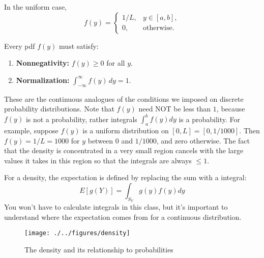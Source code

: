 In the uniform case,  
\[
f(y) = 
\begin{cases}
1/L, & y \in [a,b], \\
0, & \text{otherwise}.
\end{cases}
\]  

Every pdf \(f(y)\) must satisfy:  
\begin{enumerate}
\item \textbf{Nonnegativity:} \(f(y) \ge 0\) for all \(y\).  
\item \textbf{Normalization:} \(\int_{-\infty}^{\infty} f(y)\,dy = 1\).  
\end{enumerate}

These are the continuous analogues of the conditions we imposed on discrete probability distributions.  Note that $f(y)$ need NOT be less than $1$, because $f(y)$ is not a probability, rather integrals $\int_{a}^bf(y)dy$ is a probability. For example, suppose $f(y)$ is a uniform distribution on $[0,L] = [0,1/1000]$. Then $f(y) = 1/L = 1000$ for $y$ between $0$ and $1/1000$, and zero otherwise. The fact that the density is concentrated in a very small region cancels with the large values it takes in this region so that the integrals are always $\le 1$.

For a density, the expectation is defined by replacing the sum with a integral: 
\begin{equation}
E[g(Y)] = \int_{S_Y}g(y)f(y)dy
\end{equation}
You won't have to calculate integrals in this class, but it's important to understand where the expectation comes from for a continuous distribution. 

\begin{figure}[h]
\centering
\texttt{[image: ./../figures/density]}
\caption{The density and its relationship to probabilities}\label{fig:density}
\end{figure}



